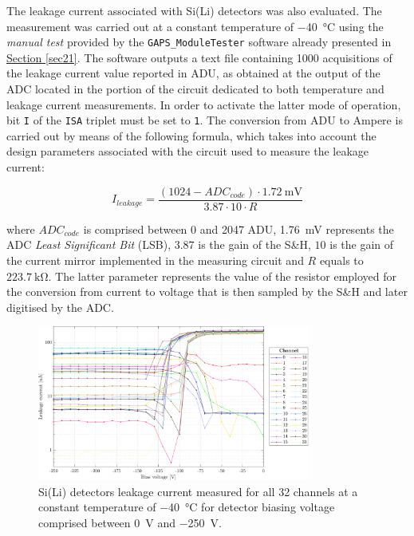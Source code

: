 The leakage current associated with Si(Li) detectors was also evaluated. The measurement was carried out at a constant temperature of \SI{-40}{\celsius} using the \textit{manual test} provided by the \texttt{GAPS\_ModuleTester} software already presented in \hyperref[sec21]{Section \ref{sec21}}. The software outputs a text file containing 1000 acquisitions of the leakage current value reported in ADU, as obtained at the output of the ADC located in the portion of the circuit dedicated to both temperature and leakage current measurements. In order to activate the latter mode of operation, bit \texttt{I} of the \texttt{ISA} triplet must be set to \texttt{1}. The conversion from ADU to Ampere is carried out by means of the following formula, which takes into account the design parameters associated with the circuit used to measure the leakage current:

\begin{equation}
    I_{leakage} = \frac{(1024 - ADC_{code}) \cdot \SI{1.72}{\milli\volt}}{3.87 \cdot 10 \cdot R}
\end{equation}

\noindent
where $ADC_{code}$ is comprised between 0 and 2047 ADU, \SI{1.76}{\milli\volt} represents the ADC \textit{Least Significant Bit} (LSB), $3.87$ is the gain of the S\&H, $10$ is the gain of the current mirror implemented in the measuring circuit and $R$ equals to $\SI{223.7}{\kilo\ohm}$. The latter parameter represents the value of the resistor employed for the conversion from current to voltage that is then sampled by the S\&H and later digitised by the ADC.

\begin{figure}[h!]
    \centering
    \includegraphics[width=0.8\textwidth]{Images/chap3/results/leakage_current.pdf}
    \caption{Si(Li) detectors leakage current measured for all 32 channels at a constant temperature of \SI{-40}{\celsius} for detector biasing voltage comprised between \SI{0}{\volt} and \SI{-250}{\volt}.}
    \label{figLeakageVoltages}
\end{figure}

